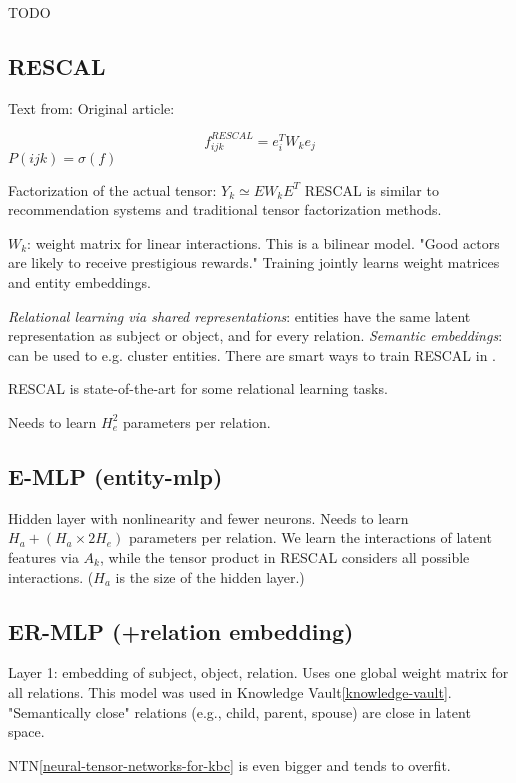 TODO

\subsection{RESCAL}
Text from:
\cite{review-of-relational-ml-for-kgs}
Original article:
\cite{rescal}

$$f_{ijk}^{RESCAL}=e_i^T W_k e_j$$
$P(ijk)=\sigma(f)$

Factorization of the actual tensor: $Y_k \simeq E W_k E^T$
RESCAL is similar to recommendation systems and traditional tensor factorization
methods.

$W_k$: weight matrix for linear interactions.
This is a bilinear model.
"Good actors are likely to receive prestigious rewards."
Training jointly learns weight matrices and entity embeddings.

\textit{Relational learning via shared representations}:
entities have the same latent representation as subject or object, and for every
relation.
\textit{Semantic embeddings}: can be used to e.g. cluster entities.
There are smart ways to train RESCAL in \cite{review-of-relational-ml-for-kgs}.

RESCAL is state-of-the-art for some relational learning tasks.

Needs to learn $H_e^2$ parameters per relation.

\subsection{E-MLP (entity-mlp)}

Hidden layer with nonlinearity and fewer neurons.
Needs to learn $H_a + (H_a \times 2H_e)$ parameters per relation.
We learn the interactions of latent features via $A_k$, while the tensor product
in RESCAL considers all possible interactions.
($H_a$ is the size of the hidden layer.)

\subsection{ER-MLP (+relation embedding)}

Layer 1: embedding of subject, object, relation. Uses one global weight matrix
for all relations. This model was used in Knowledge Vault\ref{knowledge-vault}.
"Semantically close" relations (e.g., child, parent, spouse) are close in latent
space\cite{knowledge-vault}.

NTN\ref{neural-tensor-networks-for-kbc} is even bigger and tends to overfit.

